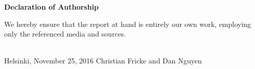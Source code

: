 \titlepage%

\vspace*{\fill}
\begin{center}
  \bfseries\sffamily Declaration of Authorship
\end{center}
\vspace{1cm}

We hereby ensure that the report at hand is entirely our own work, employing
only the referenced media and sources.

\vspace{1cm}
\hfill \makebox[.5\textwidth]{\dotfill} \\
Helsinki, November 25, 2016 \hfill Christian Fricke and Dan Nguyen \\

\vspace*{\fill}
